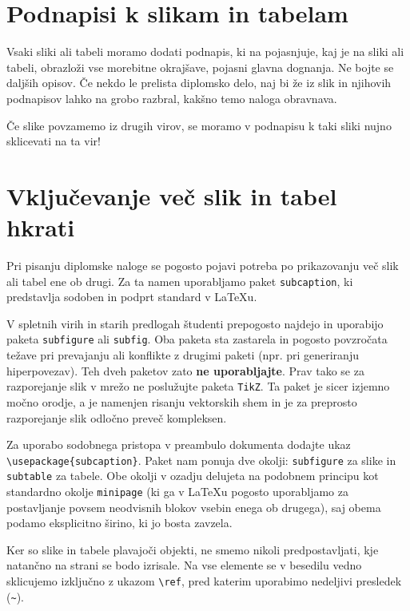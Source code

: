 \documentclass[a4paper,12pt,openright]{book}
\begin{document}
\section{Podnapisi k slikam in tabelam}

Vsaki sliki ali tabeli moramo dodati podnapis, ki na pojasnjuje, kaj je na sliki ali tabeli, obrazloži vse morebitne okrajšave, pojasni glavna dognanja. Ne bojte se daljših opisov.
Če nekdo le prelista diplomsko delo, naj bi že iz slik in njihovih podnapisov lahko na grobo razbral, kakšno temo naloga obravnava.

Če slike povzamemo iz drugih virov, se moramo v podnapisu k taki sliki nujno sklicevati na ta vir!

\section{Vključevanje več slik in tabel hkrati}

Pri pisanju diplomske naloge se pogosto pojavi potreba po prikazovanju več slik ali tabel ene ob drugi. Za ta namen uporabljamo paket \texttt{subcaption}, ki predstavlja sodoben in podprt standard v \LaTeX u. 

V spletnih virih in starih predlogah študenti prepogosto najdejo in uporabijo paketa \texttt{subfigure} ali \texttt{subfig}. Oba paketa sta zastarela in pogosto povzročata težave pri prevajanju ali konflikte z drugimi paketi (npr. pri generiranju hiperpovezav). Teh dveh paketov zato \textbf{ne uporabljajte}. Prav tako se za razporejanje slik v mrežo ne poslužujte paketa \texttt{TikZ}. Ta paket je sicer izjemno močno orodje, a je namenjen risanju vektorskih shem in je za preprosto razporejanje slik odločno preveč kompleksen.

Za uporabo sodobnega pristopa v preambulo dokumenta dodajte ukaz \texttt{\textbackslash usepackage\{subcaption\}}.
Paket nam ponuja dve okolji: \texttt{subfigure} za slike in \texttt{subtable} za tabele. Obe okolji v ozadju delujeta na podobnem principu kot standardno okolje \texttt{minipage} (ki ga v \LaTeX u pogosto uporabljamo za postavljanje povsem neodvisnih blokov vsebin enega ob drugega), saj obema podamo eksplicitno širino, ki jo bosta zavzela.

Ker so slike in tabele plavajoči objekti, ne smemo nikoli predpostavljati, kje natančno na strani se bodo izrisale. Na vse elemente se v besedilu vedno sklicujemo izključno z ukazom \texttt{\textbackslash ref}, pred katerim uporabimo nedeljivi presledek (\verb|~|).
\end{document}
